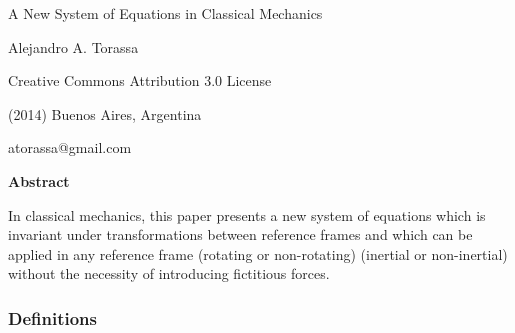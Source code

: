 \documentclass[10pt,fleqn]{article}
\begin{document}
\begin{center}

{\Large A New System of Equations in Classical Mechanics}

\bigskip \medskip

Alejandro A. Torassa

\bigskip \medskip

\footnotesize

Creative Commons Attribution 3.0 License

(2014) Buenos Aires, Argentina

atorassa@gmail.com

\bigskip \smallskip

\small

{\bf Abstract}

\bigskip

\parbox{123mm}{In classical mechanics, this paper presents a new system of equations which is invariant under transformations between reference frames and which can be applied in any reference frame (rotating or non-rotating) (inertial or non-inertial) without the necessity of introducing fictitious forces.}

\end{center}

\normalsize

\vspace{-0.60em}

{\centering\subsubsection*{Definitions}}

\vspace{+0.60em}
\end{document}
